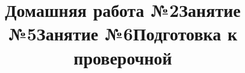 \newpage
\title{Домашняя работа №2}
\begin{listofex}
	\item {}
	\item {}
	\item {}
	\item {}
	\item {}
	\item {}
	\item {}
\end{listofex}
\newpage
\title{Занятие №5}
\begin{listofex}
	\item {}
	\item {}
	\item {}
	\item {}
	\item {}
	\item {}
	\item {}
	\item {}
\end{listofex}
\newpage
\title{Занятие №6}
\begin{listofex}
	\item {}
	\item {}
	\item {}
	\item {}
	\item {}
	\item {}
	\item[\loeitem{7*}] 
	\item[\loeitem{8*}] 
\end{listofex}
\newpage
\title{Подготовка к проверочной}

